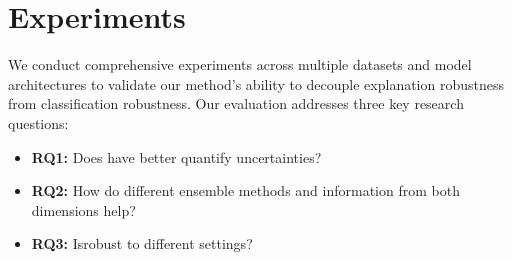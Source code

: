 \section{Experiments}

We conduct comprehensive experiments across multiple datasets and model architectures to validate our method's ability to decouple explanation robustness from classification robustness. Our evaluation addresses three key research questions:
\begin{itemize}
    \item \textbf{RQ1:} Does \ours have better quantify uncertainties?
    \item \textbf{RQ2:} How do different ensemble methods and information from both dimensions help?
    \item \textbf{RQ3:} Is\ours robust to different settings? 
\end{itemize}


\begin{table}[H]
\centering
{}
\vspace{-1mm}
\caption{The baseline methods and explanations.}
\vspace{-5mm}
\label{tab:baslines}
\end{table}


